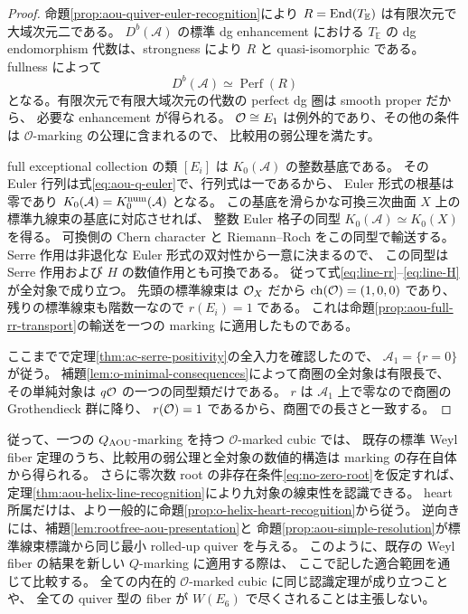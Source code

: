 \begin{proof}
命題\ref{prop:aou-quiver-euler-recognition}により
$R=\operatorname{End}(T_{\mathbb E})$ は有限次元で大域次元二である。
$D^b(\mathcal A)$ の標準 dg enhancement における
$T_{\mathbb E}$ の dg endomorphism 代数は、strongness により $R$ と quasi-isomorphic である。
fullness によって
\[
 D^b(\mathcal A)\simeq\operatorname{Perf}(R)
\]
となる。有限次元で有限大域次元の代数の perfect dg 圏は smooth proper だから、
必要な enhancement が得られる。
$\mathcal O\cong E_1$ は例外的であり、その他の条件は $\mathcal O$-marking の公理に含まれるので、
比較用の弱公理を満たす。

full exceptional collection の類 $[E_i]$ は $K_0(\mathcal A)$ の整数基底である。
その Euler 行列は式\eqref{eq:aou-q-euler}で、行列式は一であるから、
Euler 形式の根基は零であり $K_0(\mathcal A)=K_0^{\rm num}(\mathcal A)$ となる。
この基底を滑らかな可換三次曲面 $X$ 上の標準九線束の基底に対応させれば、
整数 Euler 格子の同型 $K_0(\mathcal A)\simeq K_0(X)$ を得る。
可換側の Chern character と Riemann--Roch をこの同型で輸送する。
Serre 作用は非退化な Euler 形式の双対性から一意に決まるので、
この同型は Serre 作用および $H$ の数値作用とも可換である。
従って式\eqref{eq:line-rr}--\eqref{eq:line-H}が全対象で成り立つ。
先頭の標準線束は $\mathcal O_X$ だから $\operatorname{ch}(\mathcal O)=(1,0,0)$ であり、
残りの標準線束も階数一なので $r(E_i)=1$ である。
これは命題\ref{prop:aou-full-rr-transport}の輸送を一つの marking に適用したものである。

ここまでで定理\ref{thm:ac-serre-positivity}の全入力を確認したので、
$\mathcal A_1=\{r=0\}$ が従う。
補題\ref{lem:o-minimal-consequences}によって商圏の全対象は有限長で、
その単純対象は $q\mathcal O$ の一つの同型類だけである。
$r$ は $\mathcal A_1$ 上で零なので商圏の Grothendieck 群に降り、
$r(\mathcal O)=1$ であるから、商圏での長さと一致する。
\end{proof}

従って、一つの $Q_{\rm AOU}$-marking を持つ $\mathcal O$-marked cubic では、
既存の標準 Weyl fiber 定理のうち、比較用の弱公理と全対象の数値的構造は
marking の存在自体から得られる。
さらに零次数 root の非存在条件\eqref{eq:no-zero-root}を仮定すれば、
定理\ref{thm:aou-helix-line-recognition}により九対象の線束性を認識できる。
heart 所属だけは、より一般的に命題\ref{prop:o-helix-heart-recognition}から従う。
逆向きには、補題\ref{lem:rootfree-aou-presentation}と
命題\ref{prop:aou-simple-resolution}が標準線束標識から同じ最小 rolled-up quiver を与える。
このように、既存の Weyl fiber の結果を新しい $Q$-marking に適用する際は、
ここで記した適合範囲を通じて比較する。
全ての内在的 $\mathcal O$-marked cubic に同じ認識定理が成り立つことや、
全ての quiver 型の fiber が $W(E_6)$ で尽くされることは主張しない。

